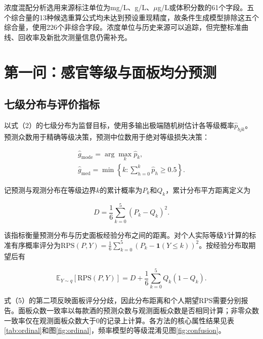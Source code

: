 \documentclass{mathorcup-journal}
\begin{document}
浓度混配分析选用来源标注单位为mg/L、g/L、$\mu$g/L或体积分数的61个字段。五个综合量的13种候选重算公式均未达到预设重现精度，故条件生成模型排除这五个综合量，使用226个非综合字段。浓度单位与历史来源可以追踪，但完整标准曲线、回收率及新批次测量信息仍需补充。


\section{第一问：感官等级与面板均分预测}

\subsection{七级分布与评价指标}

以式（2）的七级分布为监督目标，使用多输出极端随机树估计各等级概率$\hat p_{bjk}$。预测众数用于精确等级决策，预测中位数用于绝对等级损失决策：


\begin{equation}
\begin{aligned}\hat g_{\mathrm{mode}}=\arg\max_k\hat p_k,\\
\hat g_{\mathrm{med}}=\min\left\{k:\sum_{h=0}^{k}\hat p_h\ge 0.5\right\}.\end{aligned}
\end{equation}

记预测与观测分布在等级边界$k$的累计概率为$P_k$和$Q_k$，累计分布平方距离定义为


\begin{equation}
D=\frac{1}{6}\sum_{k=0}^{5}(P_k-Q_k)^2.
\end{equation}

该指标衡量预测分布与历史面板经验分布之间的距离。对个人实际等级$Y$计算的标准有序概率评分为$\mathrm{RPS}(P,Y)=\frac16\sum_{k=0}^{5}(P_k-\mathbf1(Y\le k))^2$\cite{ref8}。按经验分布取期望后有


\begin{equation}
\mathbb E_{Y\sim q}[\mathrm{RPS}(P,Y)]=D+\frac16\sum_{k=0}^{5}Q_k(1-Q_k).
\end{equation}

式（5）的第二项反映面板评分分歧，因此分布距离和个人期望RPS需要分别报告。面板众数一致率以每款酒的预测众数与观测面板众数是否相同计算；非零众数一致率仅在观测面板众数大于0的记录上计算。各方法的核心属性结果见表\ref{tab:ordinal}和图\ref{fig:ordinal}，频率模型的等级混淆见图\ref{fig:confusion}。
\end{document}
